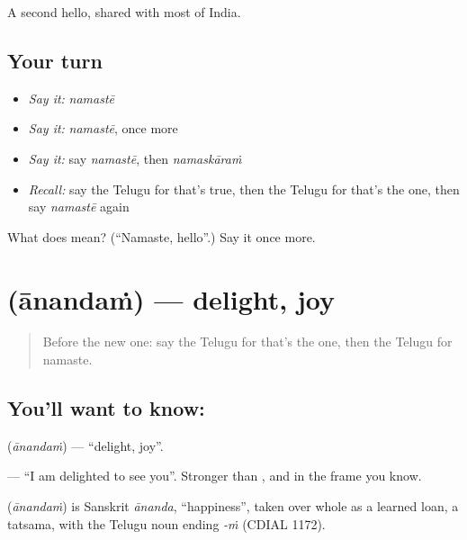 \begin{grammarlens}[title={What you've built}]
A second hello, shared with most of India.
\end{grammarlens}

\subsection*{Your turn}
\begin{itemize}
\raggedright
  \item \emph{Say it:} \emph{namastē}
  \item \emph{Say it:} \emph{namastē}, once more
  \item \emph{Say it:} say \emph{namastē}, then \emph{namaskāraṁ}
  \item \emph{Recall:} say the Telugu for that's true, then the Telugu for that's the one, then say \emph{namastē} again
\end{itemize}

\begin{tcolorbox}[breakable,colback=teal!4,colframe=teal!35!black,title={Before you move on}]
What does  mean? (\textquotedblleft{}Namaste, hello\textquotedblright{}.) Say it once more.
\end{tcolorbox}
\section[\texorpdfstring{\te{ఆనందం} (ānandaṁ)}{ఆనందం (ānandaṁ)}]{ (ānandaṁ) — delight, joy}

\label{lesson:TE-C99-delight}



\begin{quote}
Before the new one: say the Telugu for that's the one, then the Telugu for namaste.
\end{quote}

\subsection*{You'll want to know: }
\textbf{} (\emph{ānandaṁ}) — \textquotedblleft{}delight, joy\textquotedblright{}.

\textbf{   } — \textquotedblleft{}I am delighted to see you\textquotedblright{}. Stronger than \textbf{}, and in the frame you know.

\begin{cousinweb}
\textbf{} (\emph{ānandaṁ}) is Sanskrit \emph{ānanda}, \textquotedblleft{}happiness\textquotedblright{}, taken over whole as a learned loan, a tatsama, with the Telugu noun ending \emph{-ṁ} (CDIAL 1172).
\end{cousinweb}

